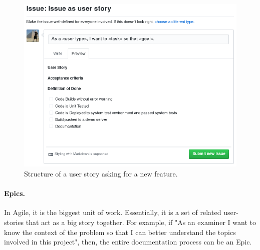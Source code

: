 \begin{figure}[h!]
		\centering
    	\includegraphics[width=\linewidth]{assets/images/issue-structure.png}
    	\caption{Structure of a user story asking for a new feature.}
    	\label{fig:issue}
\end{figure}

\paragraph*{Epics.} In Agile, it is the biggest unit of work. Essentially, it is a set of related user-stories that act as a big story together. For example, if "As an examiner I want to know the context of the problem so that I can better understand the topics involved in this project", then, the entire documentation process can be an Epic.

